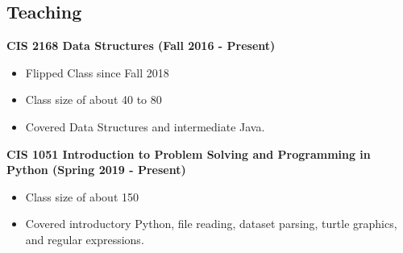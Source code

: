 \documentclass{res}
\begin{document}
\begin{resume}


\newpage
\section{Teaching}




\textbf{CIS 2168 Data Structures (Fall 2016 -  Present)}
\begin{itemize}
	\item Flipped Class since Fall 2018
	\item Class size of about 40 to 80
	\item Covered Data Structures and intermediate Java.
	
\end{itemize}

\textbf{CIS 1051 Introduction to Problem Solving and Programming in Python (Spring 2019 - Present)}
\begin{itemize}
	\item Class size of about 150
	\item Covered introductory Python, file reading, dataset parsing, turtle graphics, and regular expressions.
\end{itemize}



\end{resume}
\end{document}
